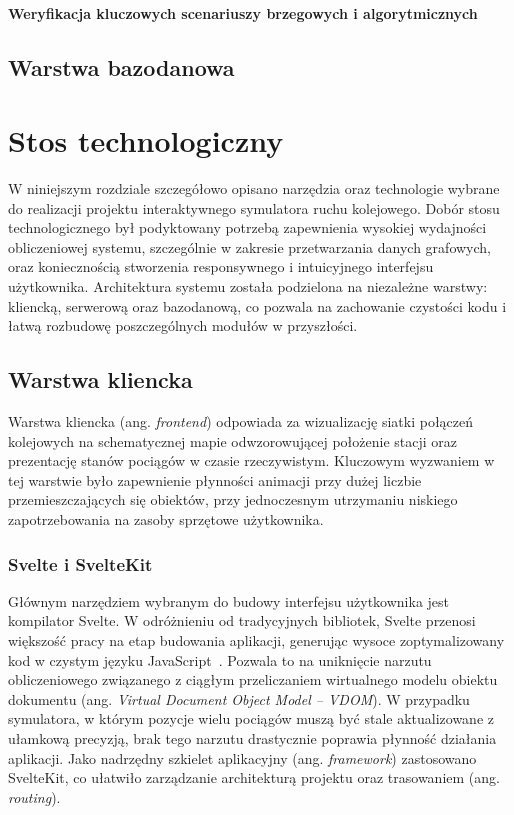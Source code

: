 \documentclass[twoside]{projektInzynierskiMS1z}
\begin{document}
    \paragraph{Weryfikacja kluczowych scenariuszy brzegowych i algorytmicznych}

\subsection{Warstwa bazodanowa}
\section{Stos technologiczny}
W niniejszym rozdziale szczegółowo opisano narzędzia oraz technologie wybrane do
realizacji projektu interaktywnego symulatora ruchu kolejowego. Dobór stosu
technologicznego był podyktowany potrzebą zapewnienia wysokiej wydajności obliczeniowej
systemu, szczególnie w zakresie przetwarzania danych grafowych, oraz koniecznością
stworzenia responsywnego i intuicyjnego interfejsu użytkownika. Architektura systemu
została podzielona na niezależne warstwy: kliencką, serwerową oraz bazodanową, co
pozwala na zachowanie czystości kodu i łatwą rozbudowę poszczególnych modułów
w przyszłości.

\subsection{Warstwa kliencka}

Warstwa kliencka (ang. \emph{frontend}) odpowiada za wizualizację siatki połączeń
kolejowych na schematycznej mapie odwzorowującej położenie stacji oraz prezentację stanów pociągów w czasie
rzeczywistym. Kluczowym wyzwaniem w tej warstwie było zapewnienie płynności animacji
przy dużej liczbie przemieszczających się obiektów, przy jednoczesnym utrzymaniu
niskiego zapotrzebowania na zasoby sprzętowe użytkownika.

\subsubsection{Svelte i SvelteKit}

Głównym narzędziem wybranym do budowy interfejsu użytkownika jest kompilator Svelte.
W odróżnieniu od tradycyjnych bibliotek, Svelte przenosi większość pracy na etap
budowania aplikacji, generując wysoce zoptymalizowany kod w czystym języku
JavaScript~\cite{svelte}. Pozwala to na uniknięcie narzutu obliczeniowego związanego
z ciągłym przeliczaniem wirtualnego modelu obiektu dokumentu (ang. \emph{Virtual
Document Object Model -- VDOM}). W przypadku symulatora, w którym pozycje wielu
pociągów muszą być stale aktualizowane z ułamkową precyzją, brak tego narzutu
drastycznie poprawia płynność działania aplikacji. Jako nadrzędny szkielet
aplikacyjny (ang. \emph{framework}) zastosowano SvelteKit, co ułatwiło zarządzanie
architekturą projektu oraz trasowaniem (ang. \emph{routing}).
\end{document}

